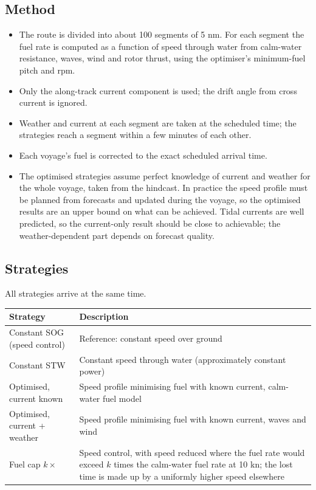 \documentclass[a4paper,11pt]{article}
\begin{document}
\subsection{Method}
\label{sec:org314c118}

\begin{itemize}
\item The route is divided into about 100 segments of 5 nm.  For each
segment the fuel rate is computed as a function of speed through
water from calm-water resistance, waves, wind and rotor thrust, using
the optimiser's minimum-fuel pitch and rpm.
\item Only the along-track current component is used; the drift angle from
cross current is ignored.
\item Weather and current at each segment are taken at the scheduled time;
the strategies reach a segment within a few minutes of each other.
\item Each voyage's fuel is corrected to the exact scheduled arrival time.
\item The optimised strategies assume perfect knowledge of current and
weather for the whole voyage, taken from the hindcast.  In practice
the speed profile must be planned from forecasts and updated during
the voyage, so the optimised results are an upper bound on what can be
achieved.  Tidal currents are well predicted, so the current-only
result should be close to achievable; the weather-dependent part
depends on forecast quality.
\end{itemize}

\subsection{Strategies}
\label{sec:orgf672ef9}

All strategies arrive at the same time.

\begin{center}
\small
\begin{tabular}{p{4.2cm}p{10.4cm}}
Strategy & Description\\[0pt]
\hline
Constant SOG (speed control) & Reference: constant speed over ground\\[0pt]
Constant STW & Constant speed through water (approximately constant power)\\[0pt]
Optimised, current known & Speed profile minimising fuel with known current, calm-water fuel model\\[0pt]
Optimised, current + weather & Speed profile minimising fuel with known current, waves and wind\\[0pt]
Fuel cap \(k\times\) & Speed control, with speed reduced where the fuel rate would exceed \(k\) times the calm-water fuel rate at 10 kn; the lost time is made up by a uniformly higher speed elsewhere\\[0pt]
\end{tabular}
\end{center}
\end{document}
